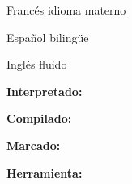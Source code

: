 \begin{skilllist}[7.7][\tbfborderleft][17]

\emergencystretch 0.1cm


\vspace{0.3cm}
\begin{languagelist}
\item{Francés}     {idioma materno}
\item{Español}     {bilingüe}
\item{Inglés}     {fluido}
\end{languagelist}
\vspace{-0.5cm}


    \textbf{Interpretado:}
    \tbfsoftinterpreted
    \vspace{-0.3cm}

    \textbf{Compilado:}
    \tbfsoftcompiled
    \vspace{-0.3cm}

    \textbf{Marcado:}
    \tbfsoftmarkup
    \vspace{-0.3cm}

    \textbf{Herramienta:}
    \tbfsofttool


\end{skilllist}



